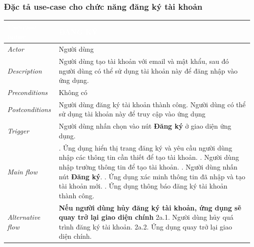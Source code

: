 \subsubsection{Đặc tả use-case cho chức năng đăng ký tài khoản}
\begin{center}
    \arrayrulewidth=2pt
    \begin{longtable}{
        |>{\raggedright\arraybackslash}p{3cm}
        |>{\raggedright\arraybackslash}p{13cm}
        |}
        \hline
        \rowcolor{cyan!75!black} \textcolor{white}{\textbf{Use-case name}} & \textcolor{white}{\textbf{ĐĂNG KÝ}}
        \\\hline
        \rowcolor{cyan!10!white} \textit{Actor} & Người dùng
        \\\hdashline
        \rowcolor{cyan!10!white} \textit{Description} & Người dùng tạo tài khoản với email và mật khẩu, sau đó người dùng có thể sử dụng tài khoản này để đăng nhập vào ứng dụng. 
        \\\hdashline
        \rowcolor{cyan!10!white} \textit{Preconditions} & Không có
        \\\hdashline
        \rowcolor{cyan!10!white} \textit{Postconditions} & Người dùng đăng ký tài khoản thành công. Người dùng có thể sử dụng tài khoản này để truy cập vào ứng dụng
        \\\hdashline
        \rowcolor{cyan!10!white} \textit{Trigger} & Người dùng nhấn chọn vào nút \textbf{Đăng ký} ở giao diện ứng dụng.
        \\\hdashline
        \rowcolor{cyan!10!white} \textit{Main flow} & 
        1. Ứng dụng hiển thị trang đăng ký và yêu cầu người dùng nhập các thông tin cần thiết để tạo tài khoản. \newline
        2. Người dùng nhập trường thông tin để tạo tài khoản. \newline
        3. Người dùng nhấn nút \textbf{Đăng ký}. \newline
        4. Ứng dụng xác minh thông tin đã nhập và tạo tài khoản mới. \newline
        5. Ứng dụng thông báo đăng ký tài khoản thành công.
        \\\hdashline
        \rowcolor{cyan!10!white} \textit{Alternative flow} & 
        \textbf{Nếu người dùng hủy đăng ký tài khoản, ứng dụng sẽ quay trở lại giao diện chính} \newline
        2a.1. Người dùng hủy quá trình đăng ký tài khoản. \newline
        2a.2. Ứng dụng quay trở lại giao diện chính.

\end{longtable}
\end{center}
